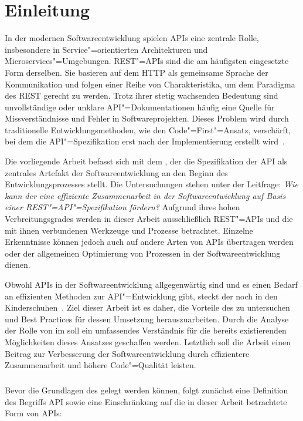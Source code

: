 \chapter{Einleitung}
\label{ch:introduction}
In der modernen Softwareentwicklung spielen \acp{API} eine zentrale Rolle, insbesondere in Service"=orientierten Architekturen und Microservices"=Umgebungen.
\acs{REST}"=\acsp{API} sind die am häufigsten eingesetzte Form derselben.
Sie basieren auf dem \acf{HTTP} als gemeinsame Sprache der Kommunikation und folgen einer Reihe von Charakteristika, um dem Paradigma des \acf{REST} gerecht zu werden.
Trotz ihrer stetig wachsenden Bedeutung sind unvollständige oder unklare \ac{API}"=Dokumentationen häufig eine Quelle für Missverständnisse und Fehler in Softwareprojekten.
Dieses Problem wird durch traditionelle Entwicklungsmethoden, wie den Code"=First"=Ansatz, verschärft, bei dem die \ac{API}"=Spezifikation erst nach der Implementierung erstellt wird~\cite[73]{bea22}.

Die vorliegende Arbeit befasst sich mit dem \AFA, der die Spezifikation der \ac{API} als zentrales Artefakt der Softwareentwicklung an den Beginn des Entwicklungsprozesses stellt.
Die Untersuchungen stehen unter der Leitfrage: \emph{Wie kann der \AFA eine effiziente Zusammenarbeit in der Softwareentwicklung auf Basis einer \acs{REST}"=\acs{API}"=Spezifikation fördern?}
Aufgrund ihres hohen Verbreitungsgrades werden in dieser Arbeit ausschließlich \acs{REST}"=\acsp{API} und die mit ihnen verbundenen Werkzeuge und Prozesse betrachtet.
Einzelne Erkenntnisse können jedoch auch auf andere Arten von \acp{API} übertragen werden oder der allgemeinen Optimierung von Prozessen in der Softwareentwicklung dienen.

Obwohl \acp{API} in der Softwareentwicklung allgegenwärtig sind und es einen Bedarf an effizienten Methoden zur \ac{API}"=Entwicklung gibt, steckt der \AFA noch in den Kinderschuhen~\cite[78]{bea22}.
Ziel dieser Arbeit ist es daher, die Vorteile des \AFAes zu untersuchen und Best Practices für dessen Umsetzung herauszuarbeiten.
Durch die Analyse der Rolle von \OA im \AFA soll ein umfassendes Verständnis für die bereits existierenden Möglichkeiten dieses Ansatzes geschaffen werden.
Letztlich soll die Arbeit einen Beitrag zur Verbesserung der Softwareentwicklung durch effizientere Zusammenarbeit und höhere Code"=Qualität leisten.

\paragraph{}
Bevor die Grundlagen des \AFAes gelegt werden können, folgt zunächst eine Definition des Begriffs \acf{API} sowie eine Einschränkung auf die in dieser Arbeit betrachtete Form von \acp{API}:

